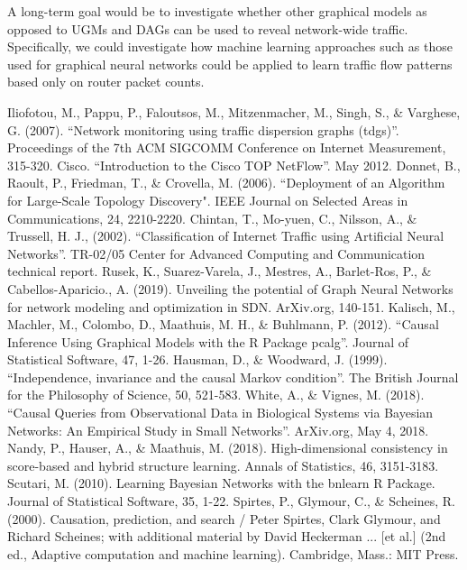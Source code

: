 \documentclass[conference]{IEEEtran}
\begin{document}
A long-term goal would be to investigate whether other graphical models as opposed to UGMs and DAGs can be used to reveal network-wide traffic. Specifically, we could investigate how machine learning approaches such as those used for graphical neural networks could be applied to learn traffic flow patterns based only on router packet counts.


\begin{thebibliography}{00}
 Iliofotou, M., Pappu, P., Faloutsos, M., Mitzenmacher, M., Singh, S., \& Varghese, G. (2007). ``Network monitoring using traffic dispersion graphs (tdgs)''. Proceedings of the 7th ACM SIGCOMM Conference on Internet Measurement, 315-320.
 Cisco. ``Introduction to the Cisco TOP NetFlow''. May 2012.
 Donnet, B., Raoult, P., Friedman, T., \& Crovella, M. (2006). ``Deployment of an Algorithm for Large-Scale Topology Discovery". IEEE Journal on Selected Areas in Communications, 24, 2210-2220.
 Chintan, T., Mo-yuen, C., Nilsson, A., \& Trussell, H. J., (2002). ``Classification of Internet Traffic using Artificial Neural Networks''. TR-02/05 Center for Advanced Computing and Communication technical report.
 Rusek, K., Suarez-Varela, J., Mestres, A., Barlet-Ros, P., \& Cabellos-Aparicio., A. (2019). Unveiling the potential of Graph Neural Networks for network modeling and optimization in SDN. ArXiv.org, 140-151.
 Kalisch, M., Machler, M., Colombo, D., Maathuis, M. H., \& Buhlmann, P. (2012). ``Causal Inference Using Graphical Models with the R Package pcalg''. Journal of Statistical Software, 47, 1-26.
 Hausman, D., \& Woodward, J. (1999). ``Independence, invariance and the causal Markov condition''. The British Journal for the Philosophy of Science, 50, 521-583.
 White, A., \& Vignes, M. (2018). ``Causal Queries from Observational Data in Biological Systems via Bayesian Networks: An Empirical Study in Small Networks''. ArXiv.org, May 4, 2018.
 Nandy, P., Hauser, A., \& Maathuis, M. (2018). High-dimensional consistency in score-based and hybrid structure learning. Annals of Statistics, 46, 3151-3183.
 Scutari, M. (2010). Learning Bayesian Networks with the bnlearn R Package. Journal of Statistical Software, 35, 1-22.
 Spirtes, P., Glymour, C., \& Scheines, R. (2000). Causation, prediction, and search / Peter Spirtes, Clark Glymour, and Richard Scheines; with additional material by David Heckerman ... [et al.] (2nd ed., Adaptive computation and machine learning). Cambridge, Mass.: MIT Press.

\end{thebibliography}
\end{document}
